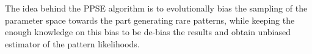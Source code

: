 \documentclass[10pt,a4paper]{article}
\theoremstyle{definition}
\theoremstyle{remark}
\begin{document}
The idea behind the PPSE algorithm is to evolutionally bias the sampling of the parameter space towards the part generating rare patterns, while keeping the enough knowledge on this bias to be de-bias the results and obtain unbiased estimator of the pattern likelihoods.

%
%
%
%
%
%
%
\end{document}
